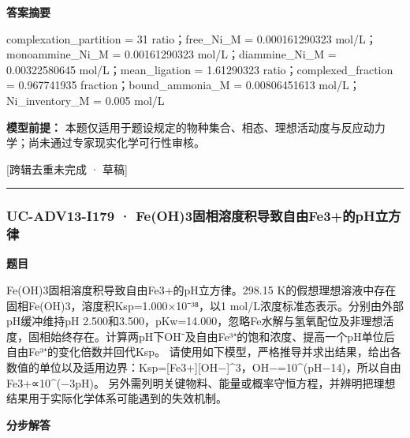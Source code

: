 \documentclass[UTF8,11pt,a4paper]{ctexart}
\begin{document}
\noindent\textbf{答案摘要}\par
complexation\_partition = 31 ratio；free\_Ni\_M = 0.000161290323 mol/L；monoammine\_Ni\_M = 0.00161290323 mol/L；diammine\_Ni\_M = 0.00322580645 mol/L；mean\_ligation = 1.61290323 ratio；complexed\_fraction = 0.967741935 fraction；bound\_ammonia\_M = 0.00806451613 mol/L；Ni\_inventory\_M = 0.005 mol/L\par
\noindent\textbf{模型前提：}
本题仅适用于题设规定的物种集合、相态、理想活动度与反应动力学；尚未通过专家现实化学可行性审核。\par
\noindent\textcolor{red!65!black}{[跨辑去重未完成 · 草稿]} \par
\medskip\hrule\medskip
{}
\subsubsection*{UC-ADV13-I179 · Fe(OH)3固相溶度积导致自由Fe3+的pH立方律}
\noindent\textbf{题目}\par
Fe(OH)3固相溶度积导致自由Fe3+的pH立方律。298.15 K的假想理想溶液中存在固相Fe(OH)3，溶度积Ksp=1.000×10⁻³⁸，以1 mol/L浓度标准态表示。分别由外部pH缓冲维持pH 2.500和3.500，pKw=14.000，忽略Fe水解与氢氧配位及非理想活度，固相始终存在。计算两pH下OH⁻及自由Fe³⁺的饱和浓度、提高一个pH单位后自由Fe³⁺的变化倍数并回代Ksp。 请使用如下模型，严格推导并求出结果，给出各数值的单位以及适用边界：Ksp=[Fe3+][OH−]\textasciicircum{}3，OH−=10\textasciicircum{}(pH−14)，所以自由Fe3+∝10\textasciicircum{}(−3pH)。 另外需列明关键物料、能量或概率守恒方程，并辨明把理想结果用于实际化学体系可能遇到的失效机制。\par
\medskip\noindent\textbf{分步解答}
\end{document}
